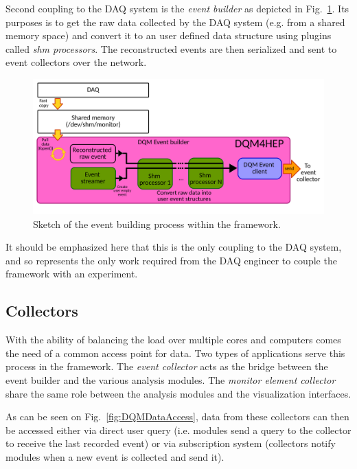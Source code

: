 \documentclass[conference]{IEEEtran}
\begin{document}
Second coupling to the DAQ system is the \textit{event builder} as depicted in Fig.~\ref{fig:DQMEventBuilder}. Its purposes is to get the raw data collected by the DAQ system (e.g. from a shared memory space) and convert it to an user defined data structure using plugins called \textit{shm processors}. The reconstructed events are then serialized and sent to event collectors over the network.

\begin{figure}[htbp]
  \begin{center}
    \includegraphics[width=0.95\linewidth]{figs/EventBuilderDiagram_IEEE.pdf}
    \caption{\label{fig:DQMEventBuilder} Sketch of the event building process within the framework.}
  \end{center}
\end{figure}

It should be emphasized here that this is the only coupling to the DAQ system, and so represents the only work required from the DAQ engineer to couple the framework with an experiment.


\subsection{Collectors}
With the ability of balancing the load over multiple cores and computers comes the need of a common access point for data. Two types of applications serve this process in the framework. The \textit{event collector} acts as the bridge between the event builder and the various analysis modules. The \textit{monitor element collector} share the same role between the analysis modules and the visualization interfaces.

As can be seen on Fig.~\ref{fig:DQMDataAccess}, data from these collectors can then be accessed either via direct user query (i.e. modules send a query to the collector to receive the last recorded event) {\color{red} or via subscription system (collectors notify modules when a new event is collected and send it)}.
\end{document}
